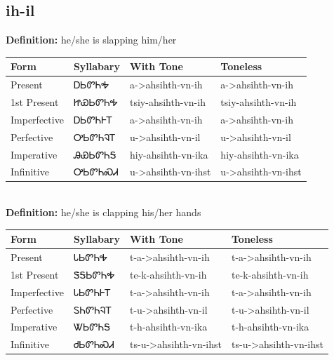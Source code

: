 \documentclass{article}%
\begin{document}
\subsection*{ih-il}%
\textbf{Definition: }%
he/she is slapping him/her%
\\[0.5em]%
\begin{tabular}{|l|l|l|l|}%
\hline%
\textbf{Form}&\textbf{Syllabary}&\textbf{With Tone}&\textbf{Toneless}\\%
\hline%
Present&ᎠᏏᏛᏂᎭ&a{-}>ahsihth{-}vn{-}ih&a{-}>ahsihth{-}vn{-}ih\\%
1st Present&ᏥᏯᏏᏛᏂᎭ&tsiy{-}ahsihth{-}vn{-}ih&tsiy{-}ahsihth{-}vn{-}ih\\%
Imperfective&ᎠᏏᏛᏂᎰᎢ&a{-}>ahsihth{-}vn{-}ih&a{-}>ahsihth{-}vn{-}ih\\%
Perfective&ᎤᏏᏛᏂᎸᎢ&u{-}>ahsihth{-}vn{-}il&u{-}>ahsihth{-}vn{-}il\\%
Imperative&ᎯᏯᏏᏛᏂᎦ&hiy{-}ahsihth{-}vn{-}ika&hiy{-}ahsihth{-}vn{-}ika\\%
Infinitive&ᎤᏏᏛᏂᏍᏗ&u{-}>ahsihth{-}vn{-}ihst&u{-}>ahsihth{-}vn{-}ihst\\%
\hline%
\end{tabular}%
\\[1em]%
\textbf{Definition: }%
he/she is clapping his/her hands%
\\[0.5em]%
\begin{tabular}{|l|l|l|l|}%
\hline%
\textbf{Form}&\textbf{Syllabary}&\textbf{With Tone}&\textbf{Toneless}\\%
\hline%
Present&ᏓᏏᏛᏂᎭ&t{-}a{-}>ahsihth{-}vn{-}ih&t{-}a{-}>ahsihth{-}vn{-}ih\\%
1st Present&ᏕᎦᏏᏛᏂᎭ&te{-}k{-}ahsihth{-}vn{-}ih&te{-}k{-}ahsihth{-}vn{-}ih\\%
Imperfective&ᏓᏏᏛᏂᎰᎢ&t{-}a{-}>ahsihth{-}vn{-}ih&t{-}a{-}>ahsihth{-}vn{-}ih\\%
Perfective&ᏚᏂᏛᏂᎸᎢ&t{-}u{-}>ahsihth{-}vn{-}il&t{-}u{-}>ahsihth{-}vn{-}il\\%
Imperative&ᏔᏏᏛᏂᎦ&t{-}h{-}ahsihth{-}vn{-}ika&t{-}h{-}ahsihth{-}vn{-}ika\\%
Infinitive&ᏧᏏᏛᏂᏍᏗ&ts{-}u{-}>ahsihth{-}vn{-}ihst&ts{-}u{-}>ahsihth{-}vn{-}ihst\\%
\hline%
\end{tabular}%
\\[1em]%
\end{document}
